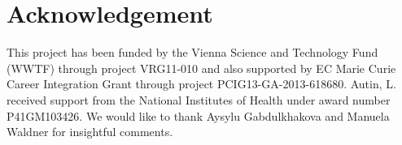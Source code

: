 \section{Acknowledgement}

This project has been funded by the Vienna Science and Technology Fund (WWTF) through project VRG11-010 and also supported by EC Marie Curie Career Integration Grant through project PCIG13-GA-2013-618680. 
Autin, L. received support from the National Institutes of Health under award number P41GM103426. We would like to thank Aysylu Gabdulkhakova and Manuela Waldner for insightful comments.
